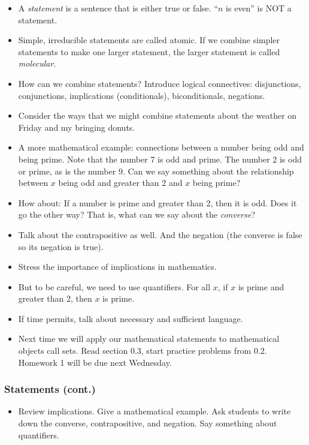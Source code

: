 \documentclass[12pt]{article}
\theoremstyle{plain}
\theoremstyle{definition}
\theoremstyle{remark}
\newcommand{\todayis}[1]{\clearpage{\rhead{\footnotesize #1}}}
\begin{document}
\begin{itemize}
  \item A \emph{statement} is a sentence that is either true or false.  ``$n$ is even'' is NOT a statement.
  \item Simple, irreducible statements are called atomic.  If we combine simpler statements to make one larger statement, the larger statement is called \emph{molecular}.
  \item How can we combine statements?  Introduce logical connectives: disjunctions, conjunctions, implications (conditionals), biconditionals, negations.
  \item Consider the ways that we might combine statements about the weather on Friday and my bringing donuts.
  \item A more mathematical example: connections between a number being odd and being prime.  Note that the number 7 is odd and prime.  The number 2 is odd or prime, as is the number 9.  Can we say something about the relationship between $x$ being odd and greater than 2 and $x$ being prime?
  \item How about: If a number is prime and greater than 2, then it is odd.  Does it go the other way?  That is, what can we say about the \emph{converse}?
  \item Talk about the contrapositive as well.  And the negation (the converse is false so its negation is true).
  \item Stress the importance of implications in mathematics.
  \item But to be careful, we need to use quantifiers.  For all $x$, if $x$ is prime and greater than 2, then $x$ is prime.
  \item If time permits, talk about necessary and sufficient language.
  \item Next time we will apply our mathematical statements to mathematical objects call sets.  Read section 0.3, start practice problems from 0.2.  Homework 1 will be due next Wednesday.
\end{itemize}





\todayis{Friday, August 25}
\subsubsection*{Statements (cont.)}

\begin{itemize}
  \item Review implications.  Give a mathematical example.  Ask students to write down the converse, contrapositive, and negation.  Say something about quantifiers.
\end{itemize}
\end{document}

